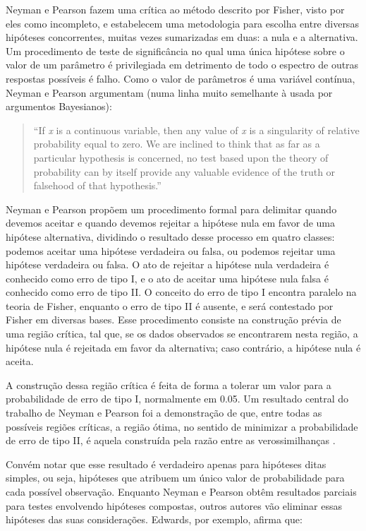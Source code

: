 Neyman e Pearson fazem uma crítica ao método descrito por Fisher, visto por eles como incompleto, e estabelecem uma metodologia
para escolha entre diversas hipóteses concorrentes, muitas vezes sumarizadas em duas: a nula e a alternativa.
Um procedimento de teste de significância
no qual uma única hipótese sobre o valor de um parâmetro é privilegiada em detrimento de todo o espectro de outras respostas
possíveis é falho. Como o valor de parâmetros é uma variável contínua, Neyman e Pearson argumentam (numa linha muito semelhante
à usada por argumentos Bayesianos):

\begin{quote}
``If {\em x} is a continuous variable, then any value of {\em x} is a singularity of relative probability equal to zero. We are
inclined to think that as far as a particular hypothesis is concerned, no test based upon the theory of probability can by
itself provide any valuable evidence of the truth or falsehood of that hypothesis.'' \citep{Neyman1933}
\end{quote}

Neyman e Pearson propõem um procedimento formal para delimitar quando devemos aceitar e quando devemos rejeitar a hipótese
nula em favor de uma hipótese alternativa, dividindo o resultado desse processo em quatro classes: podemos aceitar uma hipótese
verdadeira ou falsa, ou podemos rejeitar uma hipótese verdadeira ou falsa. O ato de rejeitar a hipótese nula verdadeira
é conhecido como erro de tipo I, e o ato de aceitar uma hipótese nula falsa é conhecido como erro de tipo II. O conceito do 
erro de tipo I encontra paralelo na teoria de Fisher, enquanto o erro de tipo II é ausente, e será contestado por Fisher em
diversas bases. Esse procedimento consiste na construção prévia de uma região crítica, tal que, se os dados observados se
encontrarem nesta região, a hipótese nula é rejeitada em favor da alternativa; caso contrário, a hipótese nula é aceita.

A construção dessa região crítica é feita de forma a tolerar um valor para a probabilidade de erro de tipo I, normalmente em
0.05. Um resultado central do trabalho de Neyman e Pearson foi a demonstração de que, entre todas as possíveis regiões críticas,
a região ótima, no sentido de minimizar a probabilidade de erro de tipo II, é aquela construída pela razão entre as 
verossimilhanças \citep{Neyman1933}. 

Convém notar que esse resultado é verdadeiro apenas para hipóteses
ditas simples, ou seja, hipóteses que atribuem um único valor de probabilidade para cada possível observação.
Enquanto Neyman e Pearson obtêm resultados
parciais para testes envolvendo hipóteses compostas, outros autores vão eliminar essas hipóteses das suas considerações.
Edwards, por exemplo, afirma que:

